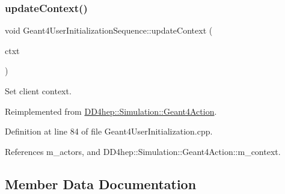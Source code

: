 \hypertarget{class_d_d4hep_1_1_simulation_1_1_geant4_user_initialization_sequence_ae73630ce8b3759e3793dc58f585a291b}{}\label{class_d_d4hep_1_1_simulation_1_1_geant4_user_initialization_sequence_ae73630ce8b3759e3793dc58f585a291b} 
\subsubsection{\texorpdfstring{update\+Context()}{updateContext()}}
{\footnotesize\ttfamily void Geant4\+User\+Initialization\+Sequence\+::update\+Context (\begin{DoxyParamCaption}\item[{\hyperlink{class_d_d4hep_1_1_simulation_1_1_geant4_context}{Geant4\+Context} $\ast$}]{ctxt }\end{DoxyParamCaption})\hspace{0.3cm}{\ttfamily [virtual]}}



Set client context. 



Reimplemented from \hyperlink{class_d_d4hep_1_1_simulation_1_1_geant4_action_ae3b9daf2af881df956c46568c0743313}{D\+D4hep\+::\+Simulation\+::\+Geant4\+Action}.



Definition at line 84 of file Geant4\+User\+Initialization.\+cpp.



References m\+\_\+actors, and D\+D4hep\+::\+Simulation\+::\+Geant4\+Action\+::m\+\_\+context.



\subsection{Member Data Documentation}
\hypertarget{class_d_d4hep_1_1_simulation_1_1_geant4_user_initialization_sequence_a9239c0d702fcde97c6bc6387af30c09e}{}\label{class_d_d4hep_1_1_simulation_1_1_geant4_user_initialization_sequence_a9239c0d702fcde97c6bc6387af30c09e} 
